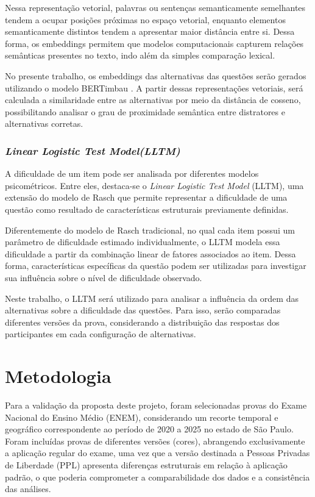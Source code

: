 \documentclass[a4paper,10pt, twocolumn]{article}
\begin{document}
Nessa representação vetorial, palavras ou sentenças semanticamente semelhantes tendem a ocupar posições próximas no espaço vetorial, enquanto elementos semanticamente distintos tendem a apresentar maior distância entre si. Dessa forma, os embeddings permitem que modelos computacionais capturem relações semânticas presentes no texto, indo além da simples comparação lexical.

No presente trabalho, os embeddings das alternativas das questões serão gerados utilizando o modelo BERTimbau \cite{souza2019portuguese}. A partir dessas representações vetoriais, será calculada a similaridade entre as alternativas por meio da distância de cosseno, possibilitando analisar o grau de proximidade semântica entre distratores e alternativas corretas.

\subsubsection{\textit{Linear Logistic Test Model(LLTM)}}
A dificuldade de um item pode ser analisada por diferentes modelos psicométricos. Entre eles, destaca-se o \textit{Linear Logistic Test Model} (LLTM), uma extensão do modelo de Rasch que permite representar a dificuldade de uma questão como resultado de características estruturais previamente definidas.

Diferentemente do modelo de Rasch tradicional, no qual cada item possui um parâmetro de dificuldade estimado individualmente, o LLTM modela essa dificuldade a partir da combinação linear de fatores associados ao item. Dessa forma, características específicas da questão podem ser utilizadas para investigar sua influência sobre o nível de dificuldade observado.

Neste trabalho, o LLTM será utilizado para analisar a influência da ordem das alternativas sobre a dificuldade das questões. Para isso, serão comparadas diferentes versões da prova, considerando a distribuição das respostas dos participantes em cada configuração de alternativas.


\section{Metodologia}

Para a validação da proposta deste projeto, foram selecionadas provas do Exame Nacional do Ensino Médio (ENEM), considerando um recorte temporal e geográfico correspondente ao período de 2020 a 2025 no estado de São Paulo. Foram incluídas provas de diferentes versões (cores), abrangendo exclusivamente a aplicação regular do exame, uma vez que a versão destinada a Pessoas Privadas de Liberdade (PPL) apresenta diferenças estruturais em relação à aplicação padrão, o que poderia comprometer a comparabilidade dos dados e a consistência das análises.
\end{document}
